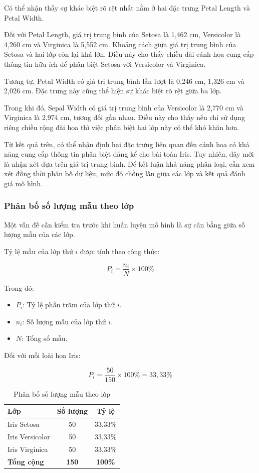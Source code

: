 \documentclass[14pt]{extarticle}
\begin{document}
	Có thể nhận thấy sự khác biệt rõ rệt nhất nằm ở hai đặc trưng Petal Length và Petal Width.
	
	Đối với Petal Length, giá trị trung bình của Setosa là 1,462 cm, Versicolor là 4,260 cm và Virginica là 5,552 cm. Khoảng cách giữa giá trị trung bình của Setosa và hai lớp còn lại khá lớn. Điều này cho thấy chiều dài cánh hoa cung cấp thông tin hữu ích để phân biệt Setosa với Versicolor và Virginica.
	
	Tương tự, Petal Width có giá trị trung bình lần lượt là 0,246 cm, 1,326 cm và 2,026 cm. Đặc trưng này cũng thể hiện sự khác biệt rõ rệt giữa ba lớp.
	
	Trong khi đó, Sepal Width có giá trị trung bình của Versicolor là 2,770 cm và Virginica là 2,974 cm, tương đối gần nhau. Điều này cho thấy nếu chỉ sử dụng riêng chiều rộng đài hoa thì việc phân biệt hai lớp này có thể khó khăn hơn.
	
	Từ kết quả trên, có thể nhận định hai đặc trưng liên quan đến cánh hoa có khả năng cung cấp thông tin phân biệt đáng kể cho bài toán Iris. Tuy nhiên, đây mới là nhận xét dựa trên giá trị trung bình. Để kết luận khả năng phân loại, cần xem xét đồng thời phân bố dữ liệu, mức độ chồng lấn giữa các lớp và kết quả đánh giá mô hình.
	
	\subsubsection{Phân bố số lượng mẫu theo lớp}
	
	Một vấn đề cần kiểm tra trước khi huấn luyện mô hình là sự cân bằng giữa số lượng mẫu của các lớp.
	
	Tỷ lệ mẫu của lớp thứ $i$ được tính theo công thức:
	
	\[
	P_i=\frac{n_i}{N}\times100\%
	\]
	
	Trong đó:
	
	\begin{itemize}
		\item $P_i$: Tỷ lệ phần trăm của lớp thứ $i$.
		\item $n_i$: Số lượng mẫu của lớp thứ $i$.
		\item $N$: Tổng số mẫu.
	\end{itemize}
	
	Đối với mỗi loài hoa Iris:
	
	\[
	P_i=\frac{50}{150}\times100\%=33,33\%
	\]
	
	\begin{table}[htbp]
		\centering
		\caption{Phân bố số lượng mẫu theo lớp}
		\label{tab:iris-class-distribution}
		\begin{tabular}{|l|c|c|}
			\hline
			\textbf{Lớp} & \textbf{Số lượng} & \textbf{Tỷ lệ} \\
			\hline
			Iris Setosa & 50 & 33,33\% \\
			\hline
			Iris Versicolor & 50 & 33,33\% \\
			\hline
			Iris Virginica & 50 & 33,33\% \\
			\hline
			\textbf{Tổng cộng} & \textbf{150} & \textbf{100\%} \\
			\hline
		\end{tabular}
	\end{table}
	
\end{document}
